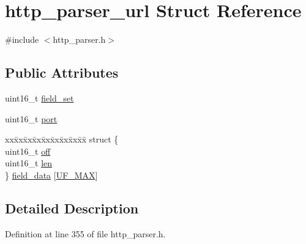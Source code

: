 \hypertarget{structhttp__parser__url}{\section{http\-\_\-parser\-\_\-url Struct Reference}
\label{structhttp__parser__url}
}


{\ttfamily \#include $<$http\-\_\-parser.\-h$>$}

\subsection*{Public Attributes}
\begin{DoxyCompactItemize}
\item 
uint16\-\_\-t \hyperlink{structhttp__parser__url_a77af61a480f11c41938810dd76ca49eb}{field\-\_\-set}
\item 
uint16\-\_\-t \hyperlink{structhttp__parser__url_a875fb8faf3ee45707078eda5435fa563}{port}
\item 
\begin{tabbing}
xx\=xx\=xx\=xx\=xx\=xx\=xx\=xx\=xx\=\kill
struct \{\\
\>uint16\_t \hyperlink{structhttp__parser__url_a6510826f3aa9a1100ac5f714323edeb1}{off}\\
\>uint16\_t \hyperlink{structhttp__parser__url_a60fb784a989dd5a95e5bd19d468d22c7}{len}\\
\} \hyperlink{structhttp__parser__url_a1b8deef68bcf0e412d56851f9dd4544b}{field\_data} \mbox{[}\hyperlink{http__parser_8h_a9ca1f91c2958091e2ac9e9b2f903d4eba4b40c88291e4fa018de04553e7e1adfd}{UF\_MAX}\mbox{]}\\

\end{tabbing}\end{DoxyCompactItemize}


\subsection{Detailed Description}


Definition at line 355 of file http\-\_\-parser.\-h.



